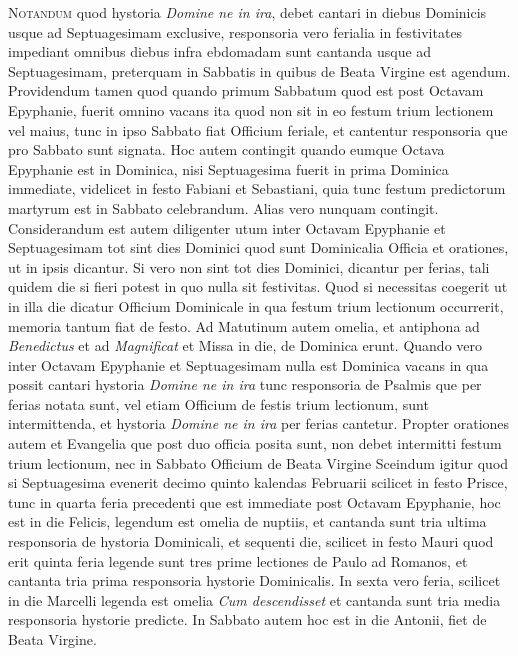 \begin{multicols*}{2}
\lettrine[lines=2]{\zallmancaps \color{Red} N}{otandum} quod hystoria \textit{Domine ne in ira}, debet cantari in diebus Dominicis usque ad Septuagesimam exclusive, responsoria vero ferialia in festivitates impediant omnibus diebus infra ebdomadam sunt cantanda usque ad Septuagesimam, preterquam in Sabbatis in quibus de Beata Virgine est agendum.
Providendum tamen quod quando primum Sabbatum quod est post Octavam Epyphanie, fuerit omnino vacans ita quod non sit in eo festum trium lectionem vel maius, tunc in ipso Sabbato fiat Officium feriale, et cantentur responsoria que pro Sabbato sunt signata.
Hoc autem contingit quando eumque Octava Epyphanie est in Dominica, nisi Septuagesima fuerit in prima Dominica immediate, videlicet in festo Fabiani et Sebastiani, quia tunc festum predictorum martyrum est in Sabbato celebrandum. Alias vero nunquam contingit.
Considerandum est autem diligenter utum inter Octavam Epyphanie et Septuagesimam tot sint dies Dominici quod sunt Dominicalia Officia et orationes, ut in ipsis dicantur. Si vero non sint tot dies Dominici, dicantur per ferias, tali quidem die si fieri potest in quo nulla sit festivitas. Quod si necessitas coegerit ut in illa die dicatur Officium Dominicale in qua festum trium lectionum occurrerit, memoria tantum fiat de festo.
Ad Matutinum autem omelia, et antiphona ad \textit{Benedictus} et ad \textit{Magnificat} et Missa in die, de Dominica erunt.
Quando vero inter Octavam Epyphanie et Septuagesimam nulla est Dominica vacans in qua possit cantari hystoria \textit{Domine ne in ira} tunc responsoria de Psalmis que per ferias notata sunt, vel etiam Officium de festis trium lectionum, sunt intermittenda, et hystoria \textit{Domine ne in ira} per ferias cantetur.
Propter orationes autem et Evangelia que post duo officia posita sunt, non debet intermitti festum trium lectionum, nec in Sabbato Officium de Beata Virgine
Sceindum igitur quod si Septuagesima evenerit decimo quinto kalendas Februarii scilicet in festo Prisce, tunc in quarta feria precedenti que est immediate post Octavam Epyphanie, hoc est in die Felicis, legendum est omelia de nuptiis, et cantanda sunt tria ultima responsoria de hystoria Dominicali, et sequenti die, scilicet in festo Mauri quod erit quinta feria legende sunt tres prime lectiones de Paulo ad Romanos, et cantanta tria prima responsoria hystorie Dominicalis. In sexta vero feria, scilicet in die Marcelli legenda est omelia \textit{Cum descendisset} et cantanda sunt tria media responsoria hystorie predicte. In Sabbato autem hoc est in die Antonii, fiet de Beata Virgine.

\end{multicols*}
